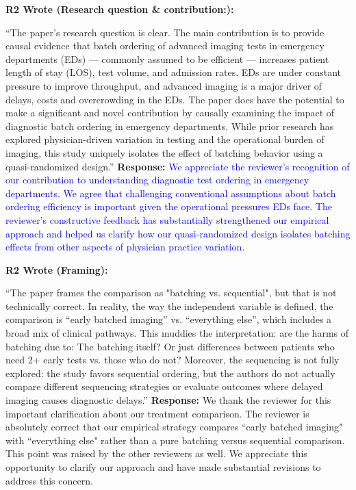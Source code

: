 \documentclass[11pt]{article}
\newenvironment{quote2}
{ \bigskip
\noindent
         \small\em
         \baselineskip=14pt
}
\newcommand{\1}{\hbox{\rm 1\kern-.35em 1}}
\begin{document}
\begin{quote2}
\textbf{R2 Wrote (Research question \& contribution:):}  

\noindent``The paper’s research question is clear. The main contribution is to provide causal evidence that batch ordering of advanced imaging tests in emergency departments (EDs) — commonly assumed to be efficient — increases patient length of stay (LOS), test volume, and admission rates. EDs are under constant pressure to improve throughput, and advanced imaging is a major driver of delays, costs and overcrowding in the EDs. The paper does have the potential to make a significant and novel contribution by causally examining the impact of diagnostic batch ordering in emergency departments. While prior research has explored physician-driven variation in testing and the operational burden of imaging, this study uniquely isolates the effect of batching behavior using a quasi-randomized design.”
\end{quote2}

\noindent\textbf{Response:} \textcolor{blue}{We appreciate the reviewer's recognition of our contribution to understanding diagnostic test ordering in emergency departments. We agree that challenging conventional assumptions about batch ordering efficiency is important given the operational pressures EDs face. The reviewer's constructive feedback has substantially strengthened our empirical approach and helped us clarify how our quasi-randomized design isolates batching effects from other aspects of physician practice variation.}

\begin{quote2}
\textbf{R2 Wrote (Framing):}  


\noindent``The paper frames the comparison as "batching vs. sequential", but that is not technically correct. In reality, the way the independent variable is defined, the comparison is “early batched imaging” vs. “everything else”, which includes a broad mix of clinical pathways. This muddies the interpretation: are the harms of batching due to: The batching itself? Or just differences between patients who need 2+ early tests vs. those who do not? Moreover, the sequencing is not fully explored: the study favors sequential ordering, but the authors do not actually compare different sequencing strategies or evaluate outcomes where delayed imaging causes diagnostic delays.”
\end{quote2}


\noindent\textbf{Response:} \color{blue}We thank the reviewer for this important clarification about our treatment comparison. The reviewer is absolutely correct that our empirical strategy compares ``early batched imaging" with ``everything else" rather than a pure batching versus sequential comparison. This point was raised by the other reviewers as well. We appreciate this opportunity to clarify our approach and have made substantial revisions to address this concern.
\end{document}
